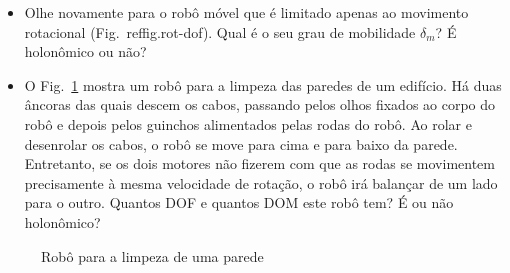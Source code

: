 {\begin{framed}
\begin{itemize}
\item Olhe novamente para o robô móvel que é limitado apenas ao movimento rotacional (Fig.~ref{fig.rot-dof}). Qual é o seu grau de mobilidade $\delta_m$? É holonômico ou não?
\item O Fig.~\ref{fig.wallcleaning} mostra um robô para a limpeza das paredes de um edifício. Há duas âncoras das quais descem os cabos, passando pelos olhos fixados ao corpo do robô e depois pelos guinchos alimentados pelas rodas do robô. Ao rolar e desenrolar os cabos, o robô se move para cima e para baixo da parede. Entretanto, se os dois motores não fizerem com que as rodas se movimentem precisamente à mesma velocidade de rotação, o robô irá balançar de um lado para o outro. Quantos DOF e quantos DOM este robô tem? É ou não holonômico?
\end{itemize}
\end{framed}


\begin{figure}
\begin{center}
\end{center}
\caption{Robô para a limpeza de uma parede}\label{fig.wallcleaning}
\end{figure}

}

